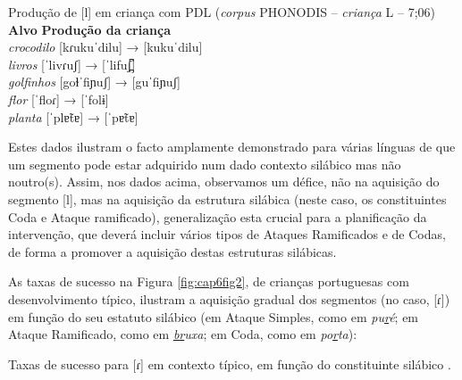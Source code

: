 \documentclass[output=paper,colorlinks,citecolor=brown,booklanguage=portuguese]{langscibook}
\begin{document}
\ea	Produção de [l] em criança com PDL (\emph{corpus} PHONODIS -- \emph{criança} L -- 7;06)\\
\gllllll {} \textbf{Alvo}  {} \textbf{Produção da criança}  \\
    \emph{crocodilo} [kɾukuˈdilu] → [kukuˈdilu]\\
    \emph{livros}  [ˈlivɾuʃ]  → [ˈlifuʃ̪͆]\\
    \emph{golfinhos}  [goɫˈfiɲuʃ]  → [guˈfiɲuʃ]\\
    \emph{flor}  [ˈfloɾ]  → [ˈfolɨ]\\
    \emph{planta} [ˈplɐ̃tɐ] → [ˈpɐ̃tɐ]\\

\z

Estes dados ilustram o facto amplamente demonstrado para várias línguas de que um segmento pode estar adquirido num dado contexto silábico mas não noutro(s). Assim, nos dados acima, observamos um défice, não na aquisição do segmento [l], mas na aquisição da estrutura silábica (neste caso, os constituintes Coda e Ataque ramificado), generalização esta crucial para a planificação da intervenção, que deverá incluir vários tipos de Ataques Ramificados e de Codas, de forma a promover a aquisição destas estruturas silábicas.

As taxas de sucesso na Figura \ref{fig:cap6fig2}, de crianças portuguesas com desenvolvimento típico, ilustram a aquisição gradual dos segmentos (no caso, [ɾ]) em função do seu estatuto silábico (em Ataque Simples, como em \emph{pu\uline{r}é}; em Ataque Ramificado, como em \emph{\uline{br}uxa}; em Coda, como em \emph{po\uline{r}ta}):




\begin{Figura}
    \caption{Taxas de sucesso para [ɾ] em contexto típico, em função do constituinte silábico \citep{Ramalho2017}.}
    \label{fig:cap6fig2}
\end{Figura}
\end{document}
